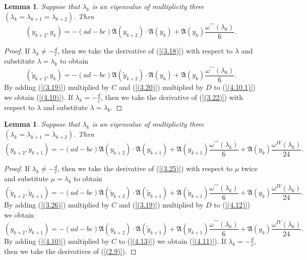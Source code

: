 \documentclass[pdflatex,sn-mathphys-num]{sn-jnl}%
\theoremstyle{thmstyleone}%
\theoremstyle{thmstyletwo}%
\theoremstyle{thmstylethree}%
\newtheorem{lem}[thm]{Lemma}
\theoremstyle{definition}
\theoremstyle{remark}
\numberwithin{equation}{section}
\begin{document}
\begin{lem} Suppose that  $\lambda _{k}$ is an eigenvalue of multiplicity three \((\lambda_{k}=\lambda_{k+1} =\lambda_{k+2})\). Then
\begin{equation}
 (y_{k+2},y_{k})=- (ad - bc)\mathfrak{A}(y_{k+2})\cdot\mathfrak{A}(y_{k})+\mathfrak{A}(y_k)\frac{\omega^{\prime\prime\prime}(\lambda_k)}{6}. \label{(4.10)}
\end{equation}
\end{lem}
\begin{proof}
If $\lambda _{k}\ne -\frac{d}{c}$, then
we take the derivative of (\ref{(3.18)}) with respect to $\lambda$ and substitute $\lambda=\lambda_k$ to obtain
\begin{equation}
 (\tilde{y}_{k+2},y_{k})=- (ad - bc)\mathfrak{A}(\tilde{y}_{k+2})\cdot\mathfrak{A}(y_{k})+\mathfrak{A}(y_k)\frac{\omega^{\prime\prime\prime}(\lambda_k)}{6}. \label{(4.10.1)}
\end{equation}
By adding (\ref{(3.19)}) multiplied by $C$ and (\ref{(3.20)}) multiplied by $D$ to (\ref{(4.10.1)}) we obtain (\ref{(4.10)}).
If $\lambda _{k}=-\frac{d}{c}$, then we take the derivative of (\ref{(3.22)}) with respect to $\lambda$ and substitute $\lambda=\lambda_k$.
\end{proof}

\begin{lem} Suppose that  $\lambda _{k}$ is an eigenvalue of multiplicity three \((\lambda_{k}=\lambda_{k+1} =\lambda_{k+2})\). Then
\begin{equation}
 (y_{k+2},y_{k+1})=- (ad - bc)\mathfrak{A}(y_{k+2})\cdot\mathfrak{A}(y_{k+1})+\mathfrak{A}(\hat{y}_{k+1})\frac{\omega^{\prime\prime\prime}(\lambda_k)}{6}+ \mathfrak{A}({y}_{k})\frac{\omega^{IV}(\lambda_k)}{24}.\label{(4.11)}
\end{equation}
\end{lem}

\begin{proof}
If $\lambda _{k}\ne -\frac{d}{c}$, then
we take the derivative of (\ref{(3.25)}) with respect to $\mu$ twice and substitute $\mu=\lambda_k$ to obtain 
\begin{equation}
 (\tilde{y}_{k+2},\tilde{y}_{k+1})=- (ad - bc)\mathfrak{A}(\tilde{y}_{k+2})\cdot\mathfrak{A}(\tilde{y}_{k+1})+\mathfrak{A}(\tilde{y}_{k+1})\frac{\omega^{\prime\prime\prime}(\lambda_k)}{6}+ \mathfrak{A}({y}_{k})\frac{\omega^{IV}(\lambda_k)}{24}.\label{(4.12)}
\end{equation}
By adding (\ref{(3.26)}) multiplied by $C$ and (\ref{(3.19)}) multiplied by $D$ to (\ref{(4.12)}) we obtain 
\begin{equation}
 (y_{k+2},\tilde{y}_{k+1})=- (ad - bc)\mathfrak{A}(y_{k+2})\cdot\mathfrak{A}(\tilde{y}_{k+1})+\mathfrak{A}({y}_{k+1})\frac{\omega^{\prime\prime\prime}(\lambda_k)}{6}+ \mathfrak{A}({y}_{k})\frac{\omega^{IV}(\lambda_k)}{24}.\label{(4.13)}
\end{equation}
By adding (\ref{(4.10)}) multiplied by $C$ to (\ref{(4.13)}) we obtain (\ref{(4.11)}). If $\lambda _{k}=-\frac{d}{c}$, then we take the derivatives of (\ref{(2.9)}).
\end{proof}
\end{document}
